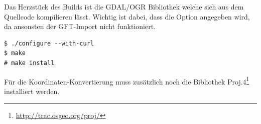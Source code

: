 Das Herzstück des Builds ist die GDAL/OGR Bibliothek welche sich aus dem Quellcode kompilieren lässt. Wichtig ist dabei, dass die Option  angegeben wird, da ansonsten der GFT-Import nicht funktioniert.

\begin{lstlisting}
$ ./configure --with-curl
$ make
# make install
\end{lstlisting}

Für die Koordinaten-Konvertierung muss zusätzlich noch die Bibliothek Proj.4\footnote{\url{http://trac.osgeo.org/proj/}} installiert werden.
